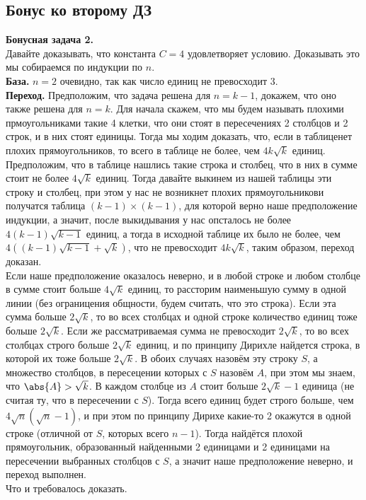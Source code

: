 \subsection{Бонус ко второму ДЗ}

\textbf{Бонусная задача 2.}\\
Давайте доказывать, что константа $C=4$ удовлетворяет условию. Доказывать это мы собираемся по индукции по $n$.\\
\textbf{База.} $n=2$ очевидно, так как число единиц не превосходит 3.\\
\textbf{Переход.} Предположим, что задача решена для $n=k-1$, докажем, что оно также решена для $n=k$. Для начала скажем, что мы будем называть плохими прмоугольниками такие 4 клетки, что они стоят в пересечениях 2 столбцов и 2 строк, и в них стоят единицы. Тогда мы ходим доказать, что, если в таблиценет плохих прямоугольников, то всего в таблице не более, чем $4k\sqrt{k}$ единиц.\\
Предположим, что в таблице нашлись такие строка и столбец, что в них в сумме стоит не более $4\sqrt{k}$ единиц. Тогда давайте выкинем из нашей таблицы эти строку и столбец, при этом у нас не возникнет плохих прямоугольникови получатся таблица $(k-1) \times (k-1)$, для которой верно наше предположение индукции, а значит, после выкидывания у нас опсталось не более $4(k-1)\sqrt{k-1}$ единиц, а тогда в исходной таблице их было не более, чем $4((k-1)\sqrt{k-1} + \sqrt{k})$, что не превосходит $4k\sqrt{k}$, таким образом, переход доказан.\\
Если наше предположение оказалось неверно, и в любой строке и любом столбце в сумме стоит больше $4\sqrt{k}$ единиц, то рассторим наименьшую сумму в одной линии (без ограницения общности, будем считать, что это строка). Если эта сумма больше $2\sqrt{k}$, то во всех столбцах и одной строке количество единиц тоже больше $2\sqrt{k}$. Если же рассматриваемая сумма не превосходит $2\sqrt{k}$, то во всех столбцах строго больше $2\sqrt{k}$ единиц, и по принципу Дирихле найдется строка, в которой их тоже больше $2\sqrt{k}$. В обоих случаях назовём эту строку $S$, а множество столбцов, в пересецении которых с $S$ назовём $A$, при этом мы знаем, что $\abs{A} > \sqrt{k}$. В каждом столбце из $A$ стоит больше $2\sqrt{k} - 1$ единица (не считая ту, что в пересечении с $S$). Тогда всего единиц будет строго больше, чем $4\sqrt{n}(\sqrt{n}-1)$, и при этом по принципу Дирихе какие-то 2 окажутся в одной строке (отличной от $S$, которых всего $n-1$). Тогда найдётся плохой прямоугольник, образованный найденными 2 единицами и 2 единицами на пересечении выбранных столбцов с $S$, а значит наше предположение неверно, и переход выполнен.\\
Что и требовалось доказать.